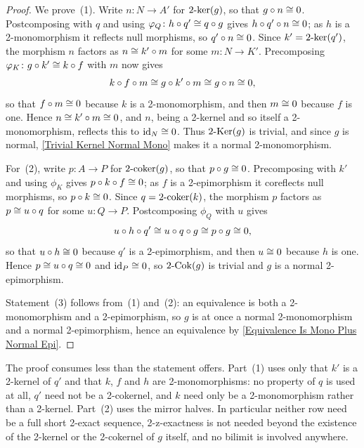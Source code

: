 \begin{proof}
  \leanok
  We prove~(1). Write \(n\colon N\to A'\) for \(2\text{-}\mathrm{ker}(g)\), so that \(g\circ n\cong 0\). Postcomposing with \(q\) and using \(\varphi_Q\colon h\circ q'\cong q\circ g\) gives \(h\circ q'\circ n\cong 0\); as \(h\) is a 2-monomorphism it reflects null morphisms, so \(q'\circ n\cong 0\). Since \(k'=2\text{-}\mathrm{ker}(q')\), the morphism \(n\) factors as \(n\cong k'\circ m\) for some \(m\colon N\to K'\). Precomposing \(\varphi_K\colon g\circ k'\cong k\circ f\) with \(m\) now gives
	\[
		k\circ f\circ m\cong g\circ k'\circ m\cong g\circ n\cong 0\text{,}
	\]
	so that \(f\circ m\cong 0\) because \(k\) is a 2-monomorphism, and then \(m\cong 0\) because \(f\) is one. Hence \(n\cong k'\circ m\cong 0\), and \(n\), being a 2-kernel and so itself a 2-monomorphism, reflects this to \(\operatorname{id}_{N}\cong 0\). Thus \(2\text{-}\mathrm{Ker}(g)\) is trivial, and since \(g\) is normal, \corx\ref{Trivial Kernel Normal Mono} makes it a normal 2-monomorphism.

	For~(2), write \(p\colon A\to P\) for \(2\text{-}\mathrm{coker}(g)\), so that \(p\circ g\cong 0\). Precomposing with \(k'\) and using \(\phi_K\) gives \(p\circ k\circ f\cong 0\); as \(f\) is a 2-epimorphism it coreflects null morphisms, so \(p\circ k\cong 0\). Since \(q=2\text{-}\mathrm{coker}(k)\), the morphism \(p\) factors as \(p\cong u\circ q\) for some \(u\colon Q\to P\). Postcomposing \(\phi_Q\) with \(u\) gives
	\[
		u\circ h\circ q'\cong u\circ q\circ g\cong p\circ g\cong 0\text{,}
	\]
	so that \(u\circ h\cong 0\) because \(q'\) is a 2-epimorphism, and then \(u\cong 0\) because \(h\) is one. Hence \(p\cong u\circ q\cong 0\) and \(\operatorname{id}_{P}\cong 0\), so \(2\text{-}\mathrm{Cok}(g)\) is trivial and \(g\) is a normal 2-epimorphism.

	Statement~(3) follows from~(1) and~(2): an equivalence is both a 2-monomorphism and a 2-epimorphism, so \(g\) is at once a normal 2-monomorphism and a normal 2-epimorphism, hence an equivalence by \corx\ref{Equivalence Is Mono Plus Normal Epi}.
\end{proof}

\begin{remark}
  \label{Rem NSFL Hypotheses}
  The proof consumes less than the statement offers. Part~(1) uses only that \(k'\) is a 2-kernel of \(q'\) and that \(k\), \(f\) and \(h\) are 2-monomorphisms: no property of \(q\) is used at all, \(q'\) need not be a 2-cokernel, and \(k\) need only be a 2-monomorphism rather than a 2-kernel. Part~(2) uses the mirror halves. In particular neither row need be a full short 2-exact sequence, 2-z-exactness is not needed beyond the existence of the 2-kernel or the 2-cokernel of \(g\) itself, and no bilimit is involved anywhere.
\end{remark}

